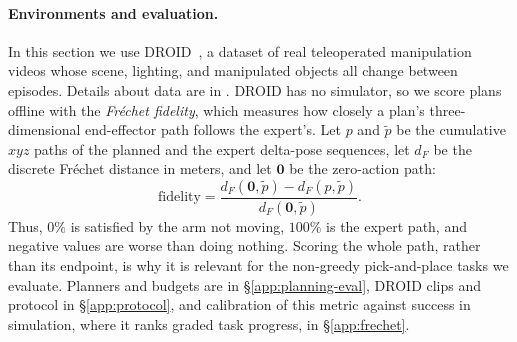 \paragraph{Environments and evaluation.}
In this section we use
DROID~\citep{khazatsky2024droid}, a dataset of real teleoperated manipulation videos whose scene, lighting, and manipulated objects all change between episodes. Details about data are in .
DROID has no simulator, so we score plans offline with the
\emph{Fr\'echet fidelity}, which measures how closely a plan's three-dimensional end-effector
path follows the expert's. Let $p$ and $\tilde p$ be the cumulative $xyz$ paths of the
planned and the expert delta-pose sequences, let $d_F$ be
the discrete Fr\'echet distance in meters, and let $\mathbf{0}$ be the zero-action path:
\begin{equation}
\label{eq:skill}
\text{fidelity} = \frac{d_F(\mathbf{0}, \tilde{p}) - d_F(p, \tilde{p})}{d_F(\mathbf{0}, \tilde{p})}.
\end{equation}
Thus, $0\%$ is satisfied by the arm not moving, $100\%$ is the expert path, and negative values are worse than
doing nothing. Scoring the whole path, rather than its endpoint, is why it is relevant for the non-greedy pick-and-place tasks we evaluate. Planners and budgets are in
\S\ref{app:planning-eval}, DROID clips and protocol in \S\ref{app:protocol}, and
calibration of this metric against success in simulation, where it ranks graded task
progress, in \S\ref{app:frechet}.

